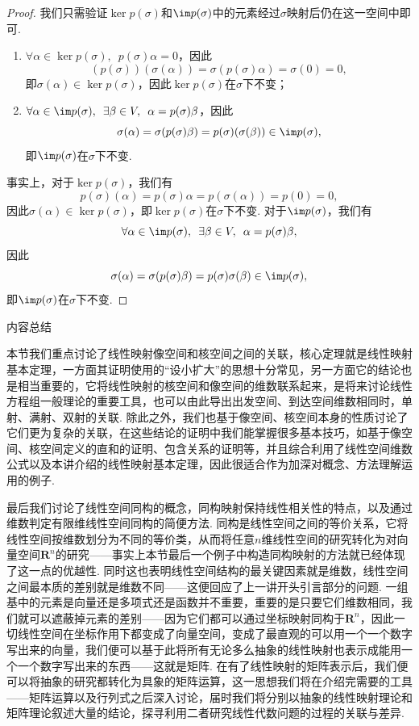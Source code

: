 \begin{proof}
    我们只需验证$\ker p(\sigma)$和$\im p(\sigma)$中的元素经过$\sigma$映射后仍在这一空间中即可.
    \begin{enumerate}
        \item $\forall \alpha\in \ker p(\sigma),\enspace p(\sigma)\alpha=0$，因此
              \[(p(\sigma))(\sigma(\alpha))=\sigma(p(\sigma)\alpha)=\sigma(0)=0,\]
              即$\sigma(\alpha)\in \ker p(\sigma)$，因此$\ker p(\sigma)$在$\sigma$下不变；

        \item $\forall \alpha\in \im p(\sigma),\enspace \exists \beta\in V,\enspace \alpha=p(\sigma)\beta$，因此
              \[\sigma(\alpha)=\sigma(p(\sigma)\beta)=p(\sigma)(\sigma(\beta))\in \im p(\sigma),\]
              即$\im p(\sigma)$在$\sigma$下不变.
    \end{enumerate}
    事实上，对于$\ker p(\sigma)$，我们有
    \[ p(\sigma)(\alpha)=p(\sigma)\alpha=p(\sigma(\alpha))=p(0)=0,\]
    因此$\sigma(\alpha)\in \ker p(\sigma)$，即$\ker p(\sigma)$在$\sigma$下不变. 对于$\im p(\sigma)$，我们有
    \[\forall \alpha\in \im p(\sigma),\enspace \exists \beta\in V,\enspace \alpha=p(\sigma)\beta,\]
    因此
    \[\sigma(\alpha)=\sigma(p(\sigma)\beta)=p(\sigma)\sigma(\beta)\in \im p(\sigma),\]
    即$\im p(\sigma)$在$\sigma$下不变.
\end{proof}


\vspace{2ex}
\centerline{\heiti \Large 内容总结}

本节我们重点讨论了线性映射像空间和核空间之间的关联，核心定理就是线性映射基本定理，一方面其证明使用的``设小扩大''的思想十分常见，另一方面它的结论也是相当重要的，它将线性映射的核空间和像空间的维数联系起来，是将来讨论线性方程组一般理论的重要工具，也可以由此导出出发空间、到达空间维数相同时，单射、满射、双射的关联. 除此之外，我们也基于像空间、核空间本身的性质讨论了它们更为复杂的关联，在这些结论的证明中我们能掌握很多基本技巧，如基于像空间、核空间定义的直和的证明、包含关系的证明等，并且综合利用了线性空间维数公式以及本讲介绍的线性映射基本定理，因此很适合作为加深对概念、方法理解运用的例子.

最后我们讨论了线性空间同构的概念，同构映射保持线性相关性的特点，以及通过维数判定有限维线性空间同构的简便方法. 同构是线性空间之间的等价关系，它将线性空间按维数划分为不同的等价类，从而将任意$n$维线性空间的研究转化为对向量空间$\mathbf{R}^n$的研究——事实上本节最后一个例子中构造同构映射的方法就已经体现了这一点的优越性. 同时这也表明线性空间结构的最关键因素就是维数，线性空间之间最本质的差别就是维数不同——这便回应了上一讲开头引言部分的问题. 一组基中的元素是向量还是多项式还是函数并不重要，重要的是只要它们维数相同，我们就可以遮蔽掉元素的差别——因为它们都可以通过坐标映射同构于$\mathbf{R}^n$，因此一切线性空间在坐标作用下都变成了向量空间，变成了最直观的可以用一个一个数字写出来的向量，我们便可以基于此将所有无论多么抽象的线性映射也表示成能用一个一个数字写出来的东西——这就是矩阵. 在有了线性映射的矩阵表示后，我们便可以将抽象的研究都转化为具象的矩阵运算，这一思想我们将在介绍完需要的工具——矩阵运算以及行列式之后深入讨论，届时我们将分别以抽象的线性映射理论和矩阵理论叙述大量的结论，探寻利用二者研究线性代数问题的过程的关联与差异.

